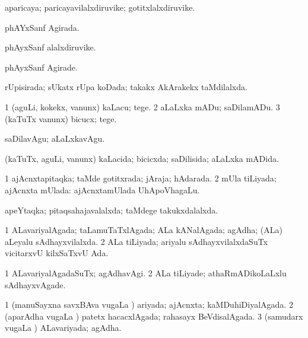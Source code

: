 \bentry
{} 
\gl{\nA}
\expl{}
\bmng
 aparicaya; paricayavilalxdiruvike; gotitxlalxdiruvike. 
\emng
\eentry

\bentry
{} 
\gl{\gu}
\expl{}
\bmng
phAYxSanf Agirada. 
\emng
\eentry

\bentry
{} 
\gl{\nA}
\expl{}
\bmng
phAyxSanf alalxdiruvike. 
\emng
\eentry

\bentry
{} 
\gl{\kirxvi}
\expl{}
\bmng
phAyxSanf Agirade. 
\emng
\eentry

\bentry
{} 
\gl{\gu}
\expl{}
\bmng
 rUpisirada; sUkatx rUpa koDada; takakx AkArakekx taMdilalxda. 
\emng
\eentry

\bentry
{} 
\gl{\sakirx}
\expl{}
\bmng
\bnum
\num{1} (aguLi, kokekx, \mo vanunx) kaLacu; tege. 
\num{2} aLaLxka mADu; saDilamADu. 
\num{3} (kaTuTx \mo vanunx) bicucx; tege. 
\enum
\emng

\noindent
\gl{\akirx}
\expl{}
\bmng
saDilavAgu; aLaLxkavAgu. 
\emng
\eentry

\bentry
{} 
\gl{\gu}
\expl{}
\bmng
 (kaTuTx, aguLi, \mo vanunx) kaLacida; bicicxda; saDilisida; aLaLxka mADida. 
\emng
\eentry

\bentry
{} 
\gl{\gu}
\expl{}
\bmng
\bnum
\num{1} ajAcnxtapitaqka; taMde gotitxrada; jAraja; hAdarada. 
\num{2} mUla tiLiyada; ajAcnxta mUlada:  ajAcnxtamUlada UhApoVhagaLu. 
\enum
\emng
\eentry

\bentry
{} 
\gl{\gu}
\expl{}
\bmng
 apeYtaqka; pitaqsahajavalalxda; taMdege takukxdalalxda. 
\emng
\eentry

\bentry
{} 
\gl{\gu}
\expl{}
\bmng
\bnum
\num{1} ALavariyalAgada; taLamuTaTxlAgada; ALa kANalAgada; agAdha; (ALa) aLeyalu sAdhayxvilalxda. 
\num{2} ALa tiLiyada; ariyalu sAdhayxvilalxdaSuTx vicitarxvU kilxSaTxvU Ada. 
\enum
\emng
\eentry

\bentry
{} 
\gl{\kirxvi}
\expl{}
\bmng
\bnum
\num{1} ALavariyalAgadaSuTx; agAdhavAgi. 
\num{2} ALa tiLiyade; athaRmADikoLaLxlu sAdhayxvAgade. 
\enum
\emng
\eentry

\bentry
{} 
\gl{\gu}
\expl{}
\bmng
\bnum
\num{1} (manuSayxna savxBAva \mo vugaLa \vi) ariyada; ajAcnxta; kaMDuhiDiyalAgada. 
\num{2} (aparAdha \mo vugaLa \vi) patetx hacacxlAgada; rahasayx BeVdisalAgada. 
\num{3} (samudarx \mo vugaLa \vi) ALavariyada; agAdha. 
\enum
\emng
\eentry

